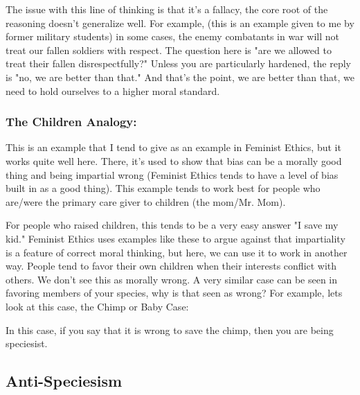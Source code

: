 The issue with this line of thinking is that it's a fallacy, the core root of the reasoning doesn't generalize well. For example, (this is an example given to me by former military students) in some cases, the enemy combatants in war will not treat our fallen soldiers with respect. The question here is "are we allowed to treat their fallen disrespectfully?" Unless you are particularly hardened, the reply is "no, we are better than that." And that's the point, we are better than that, we need to hold ourselves to a higher moral standard.
\subsubsection{The Children Analogy:}

This is an example that I tend to give as an example in Feminist Ethics, but it works quite well here. There, it's used to show that bias can be a morally good thing and being impartial wrong (Feminist Ethics tends to have a level of bias built in as a good thing). This example tends to work best for people who are/were the primary care giver to children (the mom/Mr. Mom).


For people who raised children, this tends to be a very easy answer "I save my kid." Feminist Ethics uses examples like these to argue against that impartiality is a feature of correct moral thinking, but here, we can use it to work in another way. People tend to favor their own children when their interests conflict with others. We don’t see this as morally wrong. A very similar case can be seen in favoring members of your species, why is that seen as wrong? For example, lets look at this case, the Chimp or Baby Case:


In this case, if you say that it is wrong to save the chimp, then you are being speciesist. 
\subsection{Anti-Speciesism}

